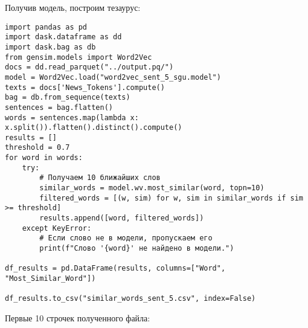\documentclass[coursework]{SCWorks}
\begin{document}
Получив модель, построим тезаурус:
\begin{verbatim}
import pandas as pd
import dask.dataframe as dd
import dask.bag as db
from gensim.models import Word2Vec
docs = dd.read_parquet("../output.pq/")
model = Word2Vec.load("word2vec_sent_5_sgu.model")
texts = docs['News_Tokens'].compute()
bag = db.from_sequence(texts)
sentences = bag.flatten()
words = sentences.map(lambda x: x.split()).flatten().distinct().compute()
results = []
threshold = 0.7
for word in words:
    try:
        # Получаем 10 ближайших слов
        similar_words = model.wv.most_similar(word, topn=10)
        filtered_words = [(w, sim) for w, sim in similar_words if sim >= threshold]
        results.append([word, filtered_words])
    except KeyError:
        # Если слово не в модели, пропускаем его
        print(f"Слово '{word}' не найдено в модели.")

df_results = pd.DataFrame(results, columns=["Word", "Most_Similar_Word"])

df_results.to_csv("similar_words_sent_5.csv", index=False)
\end{verbatim}
Первые 10 строчек полученного файла:
\end{document}
